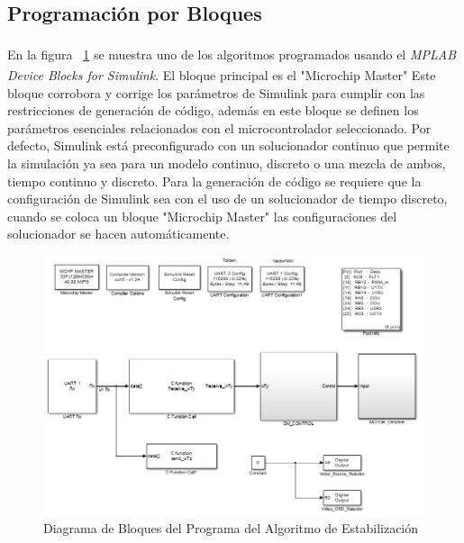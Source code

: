 \subsection{Programaci\'{o}n por Bloques}

En la figura ~\ref{fig:ProgDiag} se muestra uno de los algoritmos programados usando el \textit{MPLAB\textsuperscript{\textregistered} Device Blocks for Simulink\textsuperscript{\textregistered}}. El bloque principal es el "Microchip Master" Este bloque corrobora y corrige los par\'{a}metros de Simulink para cumplir con las restricciones de generaci\'{o}n de c\'{o}digo, adem\'{a}s en este bloque se definen los par\'{a}metros esenciales relacionados con el microcontrolador seleccionado. Por defecto, Simulink est\'{a} preconfigurado con un solucionador continuo que permite  la simulaci\'{o}n ya sea para un modelo continuo, discreto o una mezcla de ambos, tiempo continuo y discreto. Para la generaci\'{o}n de c\'{o}digo se requiere que la configuraci\'{o}n de Simulink sea con el uso de un solucionador de tiempo discreto, cuando se coloca un bloque "Microchip Master" las configuraciones del solucionador se hacen autom\'{a}ticamente.  

\begin{figure}[H]
\centering \includegraphics[scale=0.65]{img/DiaProg.png}
\caption{Diagrama de Bloques del Programa del Algoritmo de Estabilizaci\'{o}n}
\label{fig:ProgDiag}
\end{figure}

